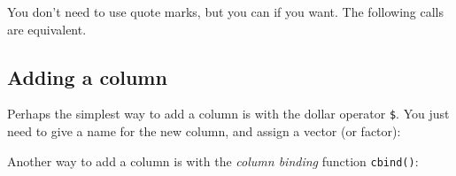 \documentclass[
]{book}
\newenvironment{Shaded}{\begin{snugshade}}{\end{snugshade}}
\newcommand{\AttributeTok}[1]{\textcolor[rgb]{0.77,0.63,0.00}{#1}}
\newcommand{\CommentTok}[1]{\textcolor[rgb]{0.56,0.35,0.01}{\textit{#1}}}
\newcommand{\ConstantTok}[1]{\textcolor[rgb]{0.00,0.00,0.00}{#1}}
\newcommand{\DecValTok}[1]{\textcolor[rgb]{0.00,0.00,0.81}{#1}}
\newcommand{\FloatTok}[1]{\textcolor[rgb]{0.00,0.00,0.81}{#1}}
\newcommand{\FunctionTok}[1]{\textcolor[rgb]{0.00,0.00,0.00}{#1}}
\newcommand{\NormalTok}[1]{#1}
\newcommand{\OtherTok}[1]{\textcolor[rgb]{0.56,0.35,0.01}{#1}}
\newcommand{\SpecialCharTok}[1]{\textcolor[rgb]{0.00,0.00,0.00}{#1}}
\newcommand{\StringTok}[1]{\textcolor[rgb]{0.31,0.60,0.02}{#1}}
\begin{document}
You don't need to use quote marks, but you can if you want. The following
calls are equivalent.

\begin{Shaded}
\end{Shaded}

\hypertarget{adding-a-column-1}{%
\subsection{Adding a column}\label{adding-a-column-1}}

Perhaps the simplest way to add a column is with the dollar operator \texttt{\$}.
You just need to give a name for the new column, and assign a vector (or factor):

\begin{Shaded}
\end{Shaded}

Another way to add a column is with the \emph{column binding} function \texttt{cbind()}:
\end{document}

